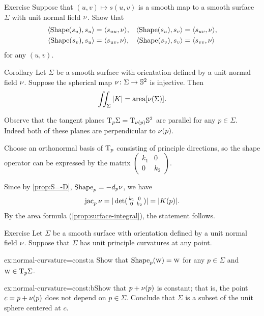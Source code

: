 \begin{thm}{Exercise}\label{ex:shape-chart}
Suppose that $(u,v)\mapsto s(u,v)$ is a smooth map to a smooth surface $\Sigma$ with unit normal field $\nu$.
Show that 
\begin{align*}
\langle \mathop{\rm Shape}\nolimits(s_u), s_u\rangle 
&=\langle s_{uu},\nu\rangle,
&
\langle \mathop{\rm Shape}\nolimits(s_u), s_v\rangle 
&=\langle s_{uv},\nu\rangle,
\\
\langle \mathop{\rm Shape}\nolimits(s_v), s_u\rangle 
&=\langle s_{uv},\nu\rangle,
&
\langle \mathop{\rm Shape}\nolimits(s_v), s_v\rangle 
&=\langle s_{vv},\nu\rangle
\end{align*}
for any $(u,v)$.

\end{thm}

\begin{thm}{Corollary}\label{cor:intK}
Let $\Sigma$ be a smooth surface with orientation defined by a unit normal field $\nu$.
Suppose the spherical map $\nu\colon\Sigma\to\mathbb{S}^2$ is injective.
Then 
\[\iint_\Sigma|K|=\mathop{\rm area}\nolimits[\nu(\Sigma)].\]
\end{thm}

Observe that the tangent planes $\mathrm{T}_p\Sigma=\mathrm{T}_{\nu(p)}\mathbb{S}^2$ are parallel for any $p\in\Sigma$.
Indeed both of these planes are perpendicular to $\nu(p)$. 


Choose an orthonormal basis of $\mathrm{T}_p$ consisting of principle directions,
so the shape operator can be expressed by the matrix 
$(\begin{smallmatrix}
   k_1
   &0
   \\
   0
   &k_2
  \end{smallmatrix})$.

Since by \ref{prop:S=-D}, $\mathop{\rm Shape}\nolimits_p=-d_p\nu$, we have
\[\mathop{\rm jac}\nolimits_p\nu=|\det(\begin{smallmatrix}
   k_1
   &0
   \\
   0
   &k_2
  \end{smallmatrix})|=|K(p)|.\]
By the area formula (\ref{prop:surface-integral}), the statement follows.
\qeds


\begin{thm}{Exercise}\label{ex:normal-curvature=const}
Let $\Sigma$ be a smooth surface with orientation defined by a unit normal field $\nu$.
Suppose that $\Sigma$ has unit principle curvatures at any point.

\begin{subthm}{ex:normal-curvature=const:a} Show that $\mathop{\rm Shape}\nolimits_p(\text{\sc{w}})=\text{\sc{w}}$ for any $p\in\Sigma$ and $\text{\sc{w}}\in \mathrm{T}_p\Sigma$.
\end{subthm}

\begin{subthm}{ex:normal-curvature=const:b}Show that $p+\nu(p)$ is constant; that is, the point $c=p+\nu(p)$ does not depend on $p\in\Sigma$.
Conclude that $\Sigma$ is a subset of the unit sphere centered at $c$.
\end{subthm}

\end{thm}

